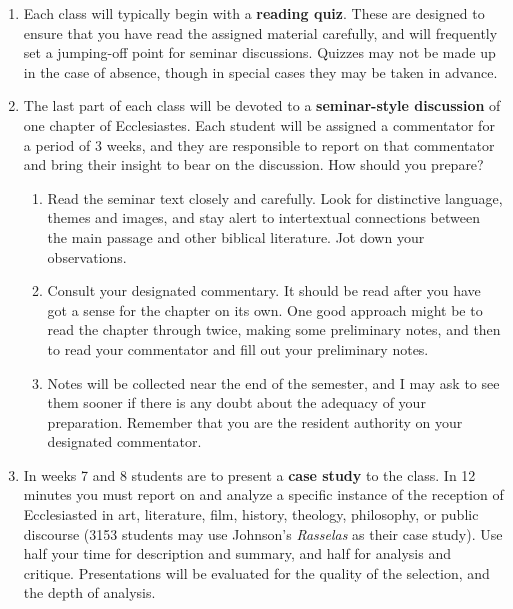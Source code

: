 \documentclass[titlepage]{article}
\begin{document}
\begin{enumerate}

	\item Each class will typically begin with a \textbf{reading quiz}.
	These are designed to ensure that you have read the assigned
	material carefully, and will frequently set a jumping-off point for
	seminar discussions. Quizzes may not be made up in the case of
	absence, though in special cases they may be taken in advance.

	\item The last part of each class will be devoted to a
	\textbf{seminar-style discussion} of one chapter of Ecclesiastes.
	Each student will be assigned a commentator for a period of 3 weeks,
	and they are responsible to report on that commentator and bring
	their insight to bear on the discussion. How should you prepare?

	\begin{enumerate}

		\item Read the seminar text closely and carefully. Look for
		distinctive language, themes and images, and stay alert to
		intertextual connections between the main passage and other
		biblical literature. Jot down your observations.

		\item Consult your designated commentary. It should be read
		after you have got a sense for the chapter on its own. One good
		approach might be to read the chapter through twice, making some
		preliminary notes, and then to read your commentator and fill
		out your preliminary notes.

		\item Notes will be collected near the end of the semester, and
		I may ask to see them sooner if there is any doubt about the
		adequacy of your preparation. Remember that you are the resident
		authority on your designated commentator.

	\end{enumerate}

	\item In weeks 7 and 8 students are to present a \textbf{case study}
	to the class. In 12 minutes you must report on and analyze a
	specific instance of the reception of Ecclesiasted in art,
	literature, film, history, theology, philosophy, or public discourse
	(3153 students may use Johnson's \emph{Rasselas} as their case
	study). Use half your time for description and summary, and half for
	analysis and critique. Presentations will be evaluated for the
	quality of the selection, and the depth of analysis.


\end{enumerate}
\end{document}
